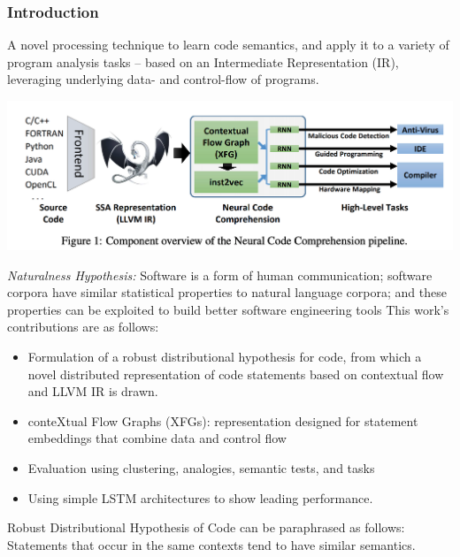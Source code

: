 \documentclass{article}
\begin{document}
\subsubsection{Introduction}
A novel processing technique to learn code semantics, and apply it to a variety of program analysis tasks – based on an Intermediate Representation (IR), leveraging underlying data- and control-flow of programs.\\
\centerline{\includegraphics[width=\columnwidth]{Images/Similarity4-1.png}}
\textit{Naturalness Hypothesis: } Software is a form of human communication; software corpora have similar statistical properties to natural language corpora; and these properties can be exploited to build better software engineering tools
This work's contributions are as follows:
\begin{itemize}
    \item Formulation of a robust distributional hypothesis for code, from which a novel distributed representation of code statements based on contextual flow and LLVM IR is drawn.
    \item conteXtual Flow Graphs (XFGs): representation designed for statement embeddings that combine data and control flow
    \item Evaluation using clustering, analogies, semantic tests, and tasks
    \item Using simple LSTM architectures to show leading performance.
\end{itemize}
Robust Distributional Hypothesis of Code can be paraphrased as follows: Statements that occur in the same contexts tend to have similar semantics.
\end{document}
